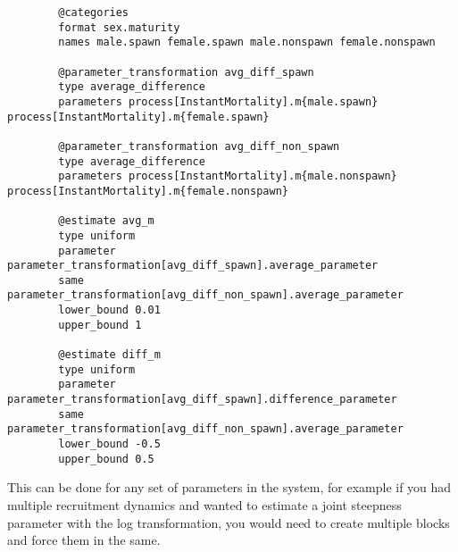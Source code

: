 {\small{\begin{verbatim}
		@categories
		format sex.maturity
		names male.spawn female.spawn male.nonspawn female.nonspawn
		
		@parameter_transformation avg_diff_spawn
		type average_difference
		parameters process[InstantMortality].m{male.spawn} process[InstantMortality].m{female.spawn}
		
		@parameter_transformation avg_diff_non_spawn
		type average_difference
		parameters process[InstantMortality].m{male.nonspawn} process[InstantMortality].m{female.nonspawn}
		
		@estimate avg_m
		type uniform
		parameter parameter_transformation[avg_diff_spawn].average_parameter
		same  parameter_transformation[avg_diff_non_spawn].average_parameter
		lower_bound 0.01
		upper_bound 1
		
		@estimate diff_m
		type uniform
		parameter parameter_transformation[avg_diff_spawn].difference_parameter
		same  parameter_transformation[avg_diff_non_spawn].average_parameter
		lower_bound -0.5
		upper_bound 0.5		
\end{verbatim}}}

This can be done for any set of parameters in the system, for example if you had multiple recruitment dynamics and wanted to estimate a joint steepness parameter with the log transformation, you would need to create multiple blocks and force them in the same.
